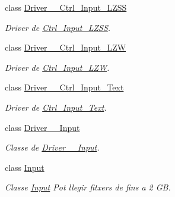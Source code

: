 \begin{DoxyCompactItemize}
class \hyperlink{classpersistencia_1_1input_1_1Driver____Ctrl__Input__LZSS}{Driver\+\_\+\+\_\+\+Ctrl\+\_\+\+Input\+\_\+\+L\+Z\+SS}
\begin{DoxyCompactList}\small\item\em Driver de \hyperlink{classpersistencia_1_1input_1_1Ctrl__Input__LZSS}{Ctrl\+\_\+\+Input\+\_\+\+L\+Z\+SS}. \end{DoxyCompactList}\item 
class \hyperlink{classpersistencia_1_1input_1_1Driver____Ctrl__Input__LZW}{Driver\+\_\+\+\_\+\+Ctrl\+\_\+\+Input\+\_\+\+L\+ZW}
\begin{DoxyCompactList}\small\item\em Driver de \hyperlink{classpersistencia_1_1input_1_1Ctrl__Input__LZW}{Ctrl\+\_\+\+Input\+\_\+\+L\+ZW}. \end{DoxyCompactList}\item 
class \hyperlink{classpersistencia_1_1input_1_1Driver____Ctrl__Input__Text}{Driver\+\_\+\+\_\+\+Ctrl\+\_\+\+Input\+\_\+\+Text}
\begin{DoxyCompactList}\small\item\em Driver de \hyperlink{classpersistencia_1_1input_1_1Ctrl__Input__Text}{Ctrl\+\_\+\+Input\+\_\+\+Text}. \end{DoxyCompactList}\item 
class \hyperlink{classpersistencia_1_1input_1_1Driver____Input}{Driver\+\_\+\+\_\+\+Input}
\begin{DoxyCompactList}\small\item\em Classe de \hyperlink{classpersistencia_1_1input_1_1Driver____Input}{Driver\+\_\+\+\_\+\+Input}. \end{DoxyCompactList}\item 
class \hyperlink{classpersistencia_1_1input_1_1Input}{Input}
\begin{DoxyCompactList}\small\item\em Classe \hyperlink{classpersistencia_1_1input_1_1Input}{Input} Pot llegir fitxers de fins a 2 GB. \end{DoxyCompactList}\end{DoxyCompactItemize}
